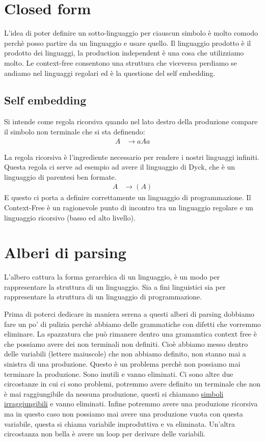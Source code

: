 \section{Closed form}

L'idea di poter definire un sotto-linguaggio per ciauscun simbolo è molto comodo perchè posso partire da un linguaggio e usare quello.
Il linguaggio prodotto è il prodotto dei linguaggi, la production independent è una cosa che utilizziamo molto.
Le context-free consentono una struttura che viceversa perdiamo se andiamo nel linguaggi regolari ed è la questione del self embedding.

\subsection{Self embedding}
Si intende come regola ricorsiva quando nel lato destro della produzione compare il simbolo non terminale che si sta definendo:
\begin{align*}
    A &\to aAa
\end{align*}

La regola ricorsiva è l'ingrediente necessario per rendere i nostri linguaggi infiniti.
Questa regola ci serve ad esempio ad avere il linguaggio di Dyck, che è un linguaggio di parentesi ben formate.
\begin{align*}
    A &\to ( A ) 
\end{align*}
E questo ci porta a definire correttamente un linguaggio di programmazione.
Il Context-Free è un ragionevole punto di incontro tra un linguaggio regolare e un linguaggio ricorsivo (basso ed alto livello).

\section{Alberi di parsing}
L'albero cattura la forma gerarchica di un linguaggio, è un modo per rappresentare la struttura di un linguaggio. Sia a fini linguistici sia per rappresentare la struttura di un linguaggio di programmazione.

Prima di poterci dedicare in maniera serena a questi alberi di parsing dobbiamo fare un po' di pulizia perchè abbiamo delle grammatiche con difetti che vorremmo eliminare. La spazzatura che può rimanere dentro una gramamtica context free è che possiamo avere dei non terminali non definiti. Cioè abbiamo messo dentro delle variabili (lettere maiuscole) che non abbiamo definito, non stanno mai a sinistra di una produzione. Questo è un problema perchè non possiamo mai terminare la produzione. Sono inutili e vanno eliminati. Ci sono altre due circostanze in cui ci sono problemi, potremmo avere definito un terminale che non è mai raggiungibile da nessuna produzione, questi si chiamano \underline{simboli irraggiungibili} e vanno eliminati. Infine potremmo avere una produzione ricorsiva ma in questo caso non possiamo mai avere una produzione vuota con questa variabile, questa si chiama variabile improduttiva e va eliminata.
Un'altra circostanza non bella è avere un loop per derivare delle variabili.

